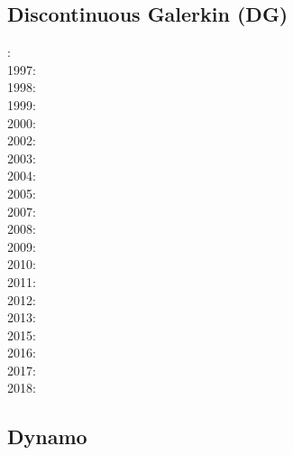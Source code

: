 \subsection{Discontinuous Galerkin (DG)}

{\scriptsize
{}: \cite{rehi73}\\
1997: \cite{bare97}\\
1998: \cite{cosh98}\\
1999: \cite{riwg99}\\
2000: \cite{coks00}\cite{brmm00}\cite{cacp00}\\
2002: \cite{cacp02}\cite{coks02}\cite{arbc02}\cite{gurw02}\\
2003: \cite{cock03}\\
2004: \cite{coks04}\\
2005: \cite{cacs05}\cite{coks05}\cite{cogo05a}\cite{cogo05b}\cite{cogo05c}\\
2007: \cite{coks07}\cite{feku07}\\
2008: \cite{kans08}\cite{mofh08}\cite{dole08}\cite{pepe08}\\
2009: \cite{coks09}\cite{cogo09}\cite{cogl09}\cite{ngpc09}\cite{shu09}\cite{codg08}\cite{cogw09}\\
2010: \cite{ngpc10}\cite{conp10}\cite{mofp10}\cite{kari10}\cite{cogs10}\\
2011: \cite{geor11}\cite{ngpc11}\\
2012: \cite{kauf12}\cite{ngpe12}\cite[chapt. 31]{lomw12}\\
2013: \cite{vyrc13}\cite{rhcv13}\\
2015: \cite{lelk15}\cite{kalc15}\\
2016: \cite{cock16}\cite{makc16}\\
2017: \cite{fewk17}\cite{iglo17}\cite{hepb17}\cite{chll17}\cite{sclu17a}\cite{sclu17b}
      \cite{sclu17c}\cite{zhan17}\\
2018: \cite{puth18}\cite{wogu18}\cite{fakr18}\cite{muwy18}
}

\subsection{Dynamo}

